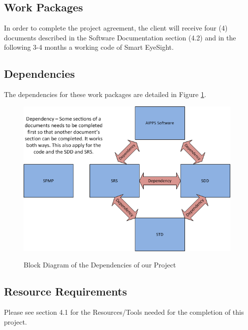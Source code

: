 \documentclass[12pt]{article}
\begin{document}
\subsection{Work Packages}
In order to complete the project agreement, the client will receive four (4) documents described in the Software Documentation section (4.2) and in the following 3-4 months a working code of Smart EyeSight.

\subsection{Dependencies}
The dependencies for these work packages are detailed in Figure \ref{dependencies}.

\begin{figure}[H]\centering
  \includegraphics[width=4.372in]{dependencies}\\
  \caption{Block Diagram of the Dependencies of our Project}\label{dependencies}
  \end{figure}

\subsection{Resource Requirements}
Please see section 4.1 for the Resources/Tools needed for the completion of this project.
\end{document}
